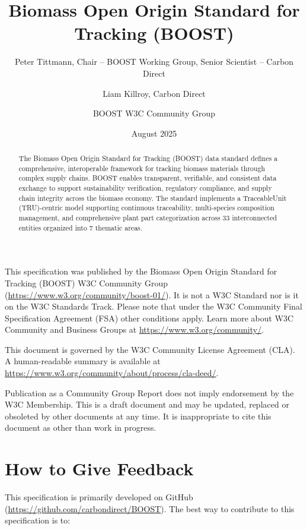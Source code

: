 \documentclass{article}
\title{Biomass Open Origin Standard for Tracking (BOOST)}
\author{Peter Tittmann, Chair -- BOOST Working Group, Senior Scientist -- Carbon Direct \and Liam Killroy, Carbon Direct \and BOOST W3C Community Group}
\date{August 2025}
\begin{document}

\boosttitle


\newpage
{}

\begin{abstract}
The Biomass Open Origin Standard for Tracking (BOOST) data standard defines a comprehensive, interoperable framework for tracking biomass materials through complex supply chains. BOOST enables transparent, verifiable, and consistent data exchange to support sustainability verification, regulatory compliance, and supply chain integrity across the biomass economy. The standard implements a TraceableUnit (TRU)-centric model supporting continuous traceability, multi-species composition management, and comprehensive plant part categorization across 33 interconnected entities organized into 7 thematic areas.
\end{abstract}

\begin{w3cstatus}
This specification was published by the Biomass Open Origin Standard for Tracking (BOOST) W3C Community Group (\url{https://www.w3.org/community/boost-01/}). It is not a W3C Standard nor is it on the W3C Standards Track. Please note that under the W3C Community Final Specification Agreement (FSA) other conditions apply. Learn more about W3C Community and Business Groups at \url{https://www.w3.org/community/}.

This document is governed by the W3C Community License Agreement (CLA). A human-readable summary is available at \url{https://www.w3.org/community/about/process/cla-deed/}.

Publication as a Community Group Report does not imply endorsement by the W3C Membership. This is a draft document and may be updated, replaced or obsoleted by other documents at any time. It is inappropriate to cite this document as other than work in progress.
\end{w3cstatus}

\section*{How to Give Feedback}
This specification is primarily developed on GitHub (\url{https://github.com/carbondirect/BOOST}). The best way to contribute to this specification is to:
\end{document}
